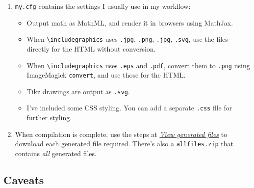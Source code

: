 \begin{enumerate}


\item \verb|my.cfg| contains the settings I usually use in my workflow:
  \begin{itemize}
  \item Output math as MathML, and render it in browsers using MathJax.
  \item When \verb|\includegraphics| uses \verb|.jpg|, \verb|.png|, \verb|.jpg|, \verb|.svg|, use the files directly for the HTML without conversion.
  \item When \verb|\includegraphics| uses \verb|.eps| and \verb|.pdf|, convert them to \verb|.png| using ImageMagick \verb|convert|, and use those for the HTML.

  \item Tikz drawings are output as \verb|.svg|.
  
  \item I've included some CSS styling. You can add a separate \verb|.css| file for further styling.
  \end{itemize}
  
\item When compilation is complete, use the steps at \href{https://www.overleaf.com/learn/how-to/View_generated_files}{\emph{View generated files}} to download each generated file required. There's also a \texttt{allfiles.zip} that contains \emph{all} generated files.
\end{enumerate}

\subsection{Caveats}